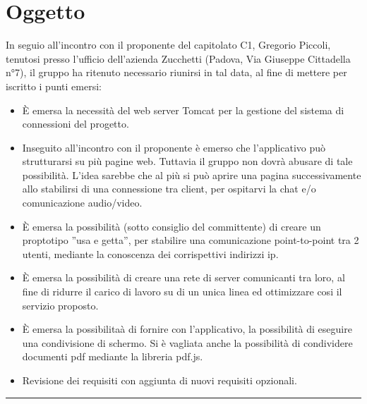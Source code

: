 \documentclass[a4paper,10pt,openright]{article}
\begin{document}
\section*{Oggetto}
In seguio all'incontro con il proponente del capitolato C1, Gregorio Piccoli, tenutosi presso l'ufficio dell'azienda Zucchetti (Padova, Via Giuseppe Cittadella n°7), il gruppo ha ritenuto necessario riunirsi in tal data, al fine di mettere per iscritto i punti emersi:
\begin{itemize}
	\item {È} emersa la necessità del web server Tomcat per la gestione del sistema di connessioni del progetto.
	\item Inseguito all'incontro con il proponente è emerso che l'applicativo può strutturarsi su più pagine web. Tuttavia il gruppo non dovrà abusare di tale possibilità. L'idea sarebbe che al più si può aprire una pagina successivamente allo stabilirsi di una connessione tra client, per ospitarvi la chat e/o comunicazione audio/video.
	\item {È} emersa la possibilità (sotto consiglio del committente) di creare un proptotipo ''usa e getta'', per stabilire una comunicazione point-to-point tra 2 utenti, mediante la conoscenza dei corrispettivi indirizzi ip.
	\item {È} emersa la possibilità di creare una rete di server comunicanti tra loro, al fine di ridurre il carico di lavoro su di un unica linea ed ottimizzare cosi il servizio proposto.
	\item {È} emersa la possibilitaà di fornire con l'applicativo, la possibilità di eseguire una condivisione di schermo. Si è vagliata anche la possibilità di condividere documenti pdf mediante la libreria pdf.js.
	\item Revisione dei requisiti con aggiunta di nuovi requisiti opzionali.
\end{itemize}
\noindent\rule{\textwidth}{0.4pt}
\end{document}
